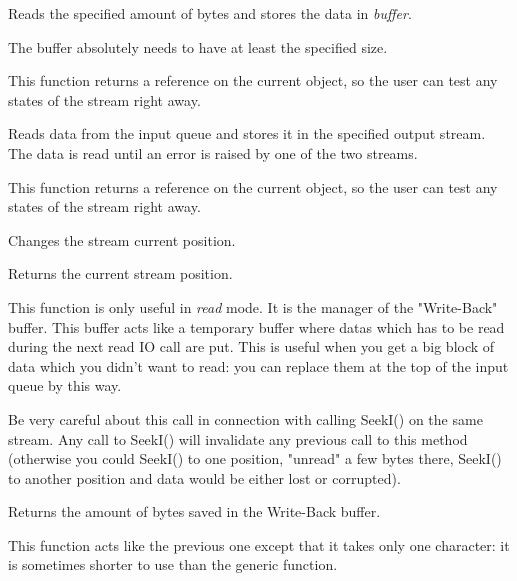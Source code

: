 Reads the specified amount of bytes and stores the data in {\it buffer}.


The buffer absolutely needs to have at least the specified size.


This function returns a reference on the current object, so the user can test
any states of the stream right away.


Reads data from the input queue and stores it in the specified output stream.
The data is read until an error is raised by one of the two streams.


This function returns a reference on the current object, so the user can test
any states of the stream right away.



Changes the stream current position.



Returns the current stream position.

\label{wxinputstreamungetch}


This function is only useful in {\it read} mode. It is the manager of the "Write-Back"
buffer. This buffer acts like a temporary buffer where datas which has to be
read during the next read IO call are put. This is useful when you get a big
block of data which you didn't want to read: you can replace them at the top
of the input queue by this way.

Be very careful about this call in connection with calling SeekI() on the same
stream. Any call to SeekI() will invalidate any previous call to this method
(otherwise you could SeekI() to one position, "unread" a few bytes there, SeekI()
to another position and data would be either lost or corrupted).


Returns the amount of bytes saved in the Write-Back buffer.


This function acts like the previous one except that it takes only one
character: it is sometimes shorter to use than the generic function.

